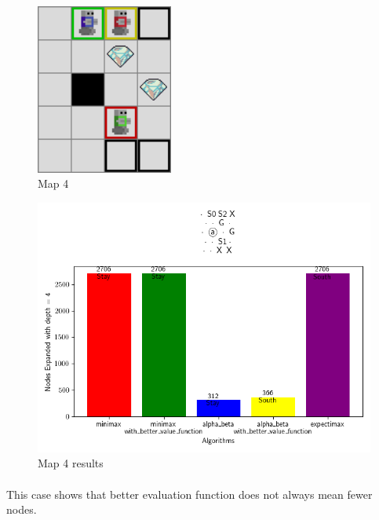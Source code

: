 \documentclass{article}
\begin{document}
\begin{figure}[h]
    \centering
    \includegraphics[width=0.4\textwidth]{media/map/map2023_10_29_13_49_35.png}
    \caption{Map 4}
    \label{fig:image4}
\end{figure}
\vspace{1em}
\begin{figure}[h]
    \centering
    \includegraphics[width=\textwidth]{media/map2023_10_29_13_49_35.png}
    \caption{Map 4 results}
    \label{fig:image4}
\end{figure}
\vspace{1em}

\paragraph{}
This case shows that better evaluation function 
does not always mean fewer nodes.

\newpage
\end{document}
